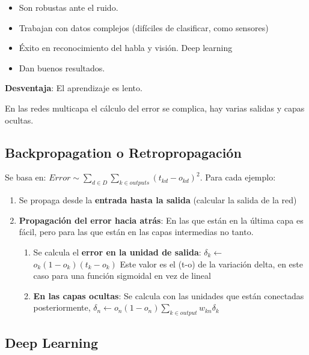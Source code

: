 \documentclass[12pt]{report} %
\begin{document}
\begin{itemize}

\item
  Son robustas ante el ruido.
\item
  Trabajan con datos complejos (difíciles de clasificar, como sensores)
\item
  Éxito en reconocimiento del habla y visión. Deep learning
\item
  Dan buenos resultados.
\end{itemize}

\textbf{Desventaja}: El aprendizaje es lento.

En las redes multicapa el cálculo del error se complica, hay varias
salidas y capas ocultas.

\subsection{Backpropagation o
Retropropagación}

Se basa en:
$Error \sim \sum _{d \in D} \sum_{k \in outputs} (t_{kd}-o_{kd})^2$.
Para cada ejemplo:

\begin{enumerate}
\def\labelenumi{\arabic{enumi}.}

\item
  Se propaga desde la \textbf{entrada hasta la salida} (calcular la
  salida de la red)
\item
  \textbf{Propagación del error hacia atrás}: En las que están en la
  última capa es fácil, pero para las que están en las capas intermedias
  no tanto.

  \begin{enumerate}
  \def\labelenumii{\arabic{enumii}.}
  
  \item
    Se calcula el \textbf{error en la unidad de salida}:
    \(\delta_k \leftarrow\) \(o_k(1-o_k)(t_k-o_k)\) Este valor es el
    (t-o) de la variación delta, en este caso para una función sigmoidal
    en vez de lineal
  \item
    \textbf{En las capas ocultas}: Se calcula con las unidades que están
    conectadas posteriormente,
    \(\delta_n \leftarrow o_n(1-o_n)\sum_{k \in output} w_{kn}\delta_k\)
  \end{enumerate}
\end{enumerate}

\subsection{Deep Learning}
\end{document}
